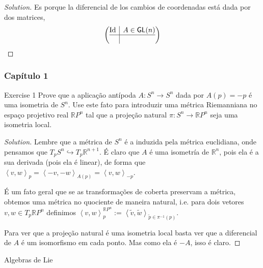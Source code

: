 \begin{proof}[Solution]\leavevmode
Es porque la diferencial de los cambios de coordenadas está dada por dos matrices,
\[\left(\begin{array}{@{}c|c@{}}
\operatorname{Id}&A \in \mathsf{GL}(n)\\
\hline
\leavevmode&\leavevmode\end{array}\right)\]

\end{proof}

\subsubsection{Capítulo 1}

\begin{thing4}{Exercise 1}\label{exer:1}\leavevmode
Prove que a aplicação antípoda \(A:S^n \to S^n\) dada por \(A(p)=-p\) é uma isometria de \(S^n\). Use este fato para introduzir uma métrica Riemanniana no espaço projetivo real \(\mathbb{R}P^{n}\) tal que a projeção natural \(\pi: S^n \to \mathbb{R}P^{n}\) seja uma isometria local.
\end{thing4}
\begin{proof}[Solution]\leavevmode
	Lembre que a métrica de \(S^n\) é a induzida pela métrica euclidiana, onde pensamos que \(T_pS^n \hookrightarrow T_p\mathbb{R}^{n+1}\). É claro que \(A\) é uma isometría de \(\mathbb{R}^n\), pois ela é a sua derivada (pois ela é linear), de forma que \(\left<v,w\right>_p=\left<-v,-w\right>_{A(p)}=\left<v,w\right>_{-p}\).

	É um fato geral que se as transformações de coberta preservam a métrica, obtemos uma métrica no quociente de maneira natural, i.e. para dois vetores \(v,w\in T_p\mathbb{R}P^n\) definimos \(\left<v,w\right>_p^{\mathbb{R}P^n}:=\left<\tilde{v},\tilde{w}\right>_{\tilde{p} \in \pi^{-1}(p)}\).

Para ver que a projeção natural é uma isometria local basta ver que a diferencial de \(A\) é um isomorfismo em cada ponto. Mas como ela é \(-A\), isso é claro.
\end{proof}



\clearpage{}
{\Huge Algebras de Lie}

